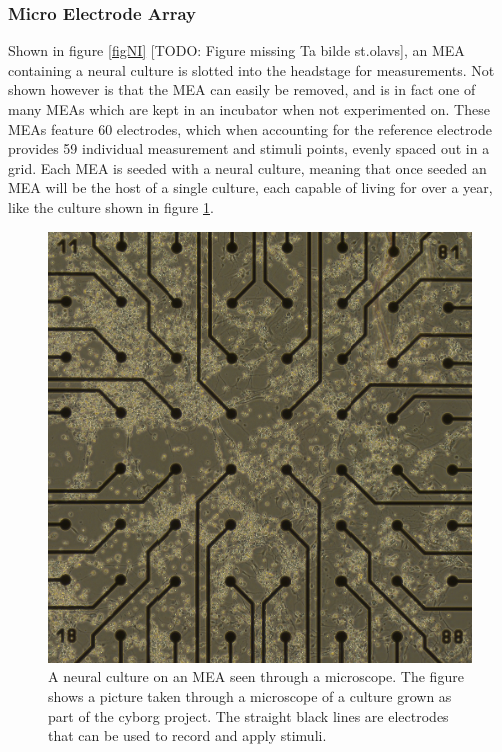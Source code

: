 \subsubsection{Micro Electrode Array}
Shown in figure \ref{figNI} [TODO: Figure missing Ta bilde st.olavs], an MEA containing a neural culture is slotted into the
headstage for measurements.
Not shown however is that the MEA can easily be removed, and is in fact one of
many MEAs which are kept in an incubator when not experimented on.
These MEAs feature 60 electrodes, which when accounting for the reference
electrode provides 59 individual measurement and stimuli points, evenly spaced
out in a grid.
Each MEA is seeded with a neural culture, meaning that once seeded an MEA will
be the host of a single culture, each capable of living for over a year, like
the culture shown in figure \ref{frank}.
\begin{figure}[h]
  \centering
  \includegraphics[width=1\textwidth]{fig/frank.png}
  \caption{
    A neural culture on an MEA seen through a microscope.
    The figure shows a picture taken through a microscope of a culture grown as
    part of the cyborg project.
    The straight black lines are electrodes that can be used to record and apply
    stimuli.
  }
  \label{frank}
\end{figure}
